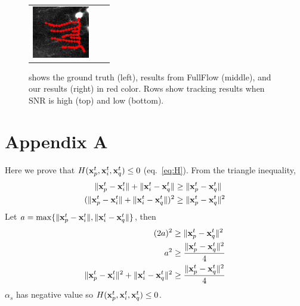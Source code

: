 \documentclass{article}
\begin{document}
\begin{figure}[tb!]
\begin{tabular}{ccc}
		{\includegraphics[width=2.5cm]{img/our_n3b.png}}  \\
	\end{tabular}
	\vspace{-10pt}
	\caption{\small{shows the ground truth (left), results from FullFlow (middle), and our results (right) in red color. Rows show tracking results when SNR is high (top) and low (bottom).}}
	\label{fig:neuroncompare}
\end{figure}


\small{}

\appendix
\section{Appendix A} \label{sec:appA}
Here we prove that $H({\bf x}_p^t,{\bf x}_i^t,{\bf x}_q^t) \leq 0$ (eq.~\ref{eq:H}). From the triangle inequality,
\[
\begin{aligned}
\| {\bf x}_p^t - {\bf x}_i^t \| + \| {\bf x}_i^t - {\bf x}_q^t \| & \geq \| {\bf x}_p^t - {\bf x}_q^t \| \\
(\| {\bf x}_p^t - {\bf x}_i^t \| + \| {\bf x}_i^t - {\bf x}_q^t \|)^2 & \geq \| {\bf x}_p^t - {\bf x}_q^t \|^2 \\
\end{aligned}
\]
Let $a = \max\{ \| {\bf x}_p^t - {\bf x}_i^t \|, \| {\bf x}_i^t - {\bf x}_q^t \| \}$, then
\[
\begin{aligned}
(2a)^2 & \geq \| {\bf x}_p^t - {\bf x}_q^t \|^2 \\
a^2 & \geq \frac{\| {\bf x}_p^t - {\bf x}_q^t \|^2}{4} \\
\| {\bf x}_p^t - {\bf x}_i^t \|^2 + \| {\bf x}_i^t - {\bf x}_q^t \|^2 & \geq \frac{\| {\bf x}_p^t - {\bf x}_q^t \|^2}{4} \\
\end{aligned}
\]
$\alpha_s$ has negative value so $H({\bf x}_p^t,{\bf x}_i^t,{\bf x}_q^t) \leq 0$.
\end{document}
